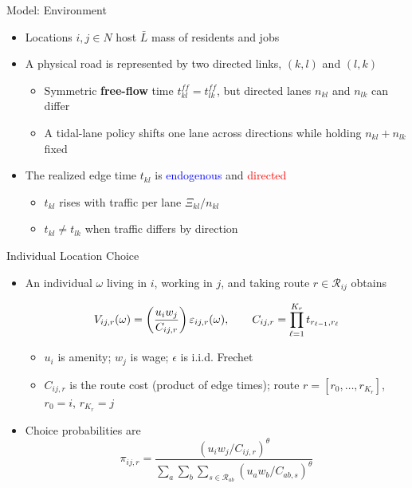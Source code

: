 \documentclass[11pt,aspectratio=169]{beamer}
\newcommand{\R}{\mathcal{R}}
\begin{document}
\begin{frame}{Model: Environment}
\begin{itemize}
  \item Locations $i,j\in N$ host $\bar{L}$ mass of residents and jobs
  \vspace{0.5em}
  \item A physical road is represented by two directed links, $(k,l)$ and $(l,k)$
  \begin{itemize}
    \item Symmetric \textbf{free-flow} time $t_{kl}^{ff}=t_{lk}^{ff}$, but directed lanes $n_{kl}$ and $n_{lk}$ can differ
    \item A tidal-lane policy shifts one lane across directions while holding $n_{kl}+n_{lk}$ fixed
  \end{itemize}
  \vspace{0.5em}
  \item The realized edge time $t_{kl}$ is \textcolor{blue}{endogenous} and \textcolor{red}{directed}
  \begin{itemize}
    \item $t_{kl}$ rises with traffic per lane $\Xi_{kl}/n_{kl}$
    \item $t_{kl} \neq t_{lk}$ when traffic differs by direction
  \end{itemize}
\end{itemize}
\end{frame}

\begin{frame}{Individual Location Choice}
\begin{itemize}
  \item An individual $\omega$ living in $i$, working in $j$, and taking route $r\in\R_{ij}$ obtains
  \vspace{-0.5em}\begin{footnotesize}\begin{equation}
    V_{ij,r}(\omega) = \left( \frac{u_i w_j}{C_{ij,r}} \right)\varepsilon_{ij,r}(\omega),
    \qquad
    C_{ij,r} = \prod_{\ell=1}^{K_r} t_{r_{\ell-1},r_\ell}
  \vspace{-1.25em}\end{equation}\end{footnotesize}
  \begin{itemize}
    \item $u_i$ is amenity; $w_j$ is wage; $\epsilon$ is i.i.d. Frechet
    \item $C_{ij,r}$ is the route cost (product of edge times); route $r=[r_0,\dots,r_{K_r}]$, $r_0=i$, $r_{K_r}=j$
  \end{itemize}
  \vspace{0.5em}
  \item Choice probabilities are
  \vspace{-0.5em}\begin{equation}\label{eq:pi}
    \pi_{ij,r} = \frac{\left(u_i w_j/C_{ij,r}\right)^\theta}{\sum_{a}\sum_b\sum_{s\in\R_{ab}}\left(u_a w_b/C_{ab,s}\right)^\theta}
  \end{equation}
\end{itemize}
\end{frame}
\end{document}

